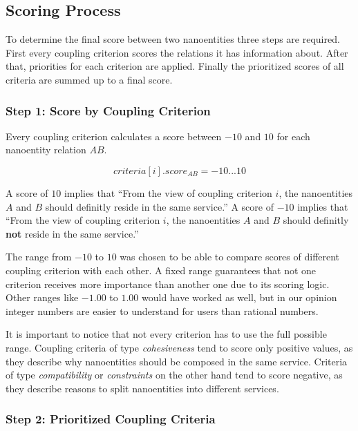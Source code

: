 \subsection{Scoring Process}

To determine the final score between two nanoentities three steps are required. First every coupling criterion scores the relations it has information about. After that, priorities for each criterion are applied. Finally the prioritized scores of all criteria are summed up to a final score.

\subsubsection{Step 1: Score by Coupling Criterion}

Every coupling criterion calculates a score between $-10$ and $10$ for each nanoentity relation $AB$. 

\begin{displaymath}
criteria[i].score_{AB} = -10 ... 10
\end{displaymath}

A score of $10$ implies that \enquote{From the view of coupling criterion $i$, the nanoentities $A$ and $B$ should definitly reside in the same service.} A score of $-10$ implies that \enquote{From the view of coupling criterion $i$, the nanoentities $A$ and $B$ should definitly \textbf{not} reside in the same service.} 

The range from $-10$ to  $10$ was chosen to be able to compare scores of different coupling criterion with each other. A fixed range guarantees that not one criterion receives more importance than another one due to its scoring logic. Other ranges like $-1.00$ to $1.00$ would have worked as well, but in our opinion integer numbers are easier to understand for users than rational numbers. 

It is important to notice that not every criterion has to use the full possible range. Coupling criteria of type \textit{cohesiveness} tend to score only positive values, as they describe why nanoentities should be composed in the same service. Criteria of type \textit{compatibility} or \textit{constraints} on the other hand tend to score negative, as they describe reasons to split nanoentities into different services.

\subsubsection{Step 2: Prioritized Coupling Criteria}

